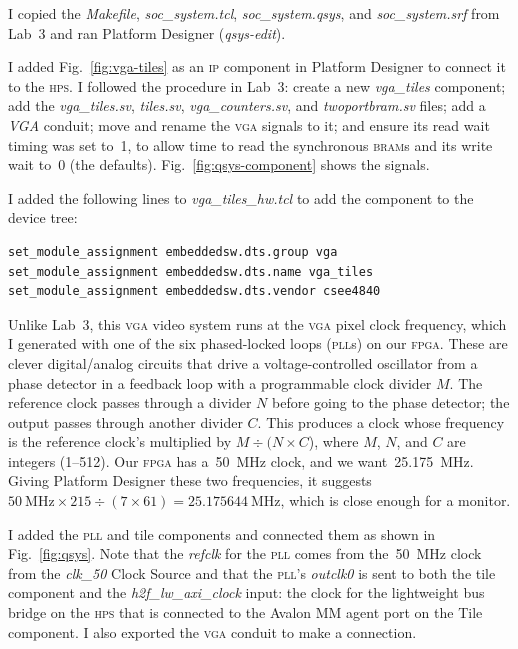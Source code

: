 \documentclass[11pt]{article}
\newcommand{\figref}[1]{Fig.~\ref{fig:#1}}
\begin{document}
I copied the \emph{Makefile}, \emph{soc\_system.tcl},
\emph{soc\_system.qsys}, and \emph{soc\_system.srf} from Lab~3 and ran
Platform Designer (\emph{qsys-edit}).

I added \figref{vga-tiles} as an \textsc{ip} component in Platform
Designer to connect it to the \textsc{hps}.  I followed the procedure
in Lab~3: create a new \emph{vga\_tiles} component; add the
\emph{vga\_tiles.sv}, \emph{tiles.sv}, \emph{vga\_counters.sv}, and
\emph{twoportbram.sv} files; add a \emph{VGA} conduit; move and rename
the \textsc{vga} signals to it; and ensure its read wait timing was
set to~1, to allow time to read the synchronous \textsc{bram}s and its
write wait to~0 (the defaults).  \figref{qsys-component} shows the
signals.

I added the following lines to \emph{vga\_tiles\_hw.tcl} to add the
component to the device tree:

\vspace{-0.5\baselineskip}

{\footnotesize
\begin{verbatim}
set_module_assignment embeddedsw.dts.group vga
set_module_assignment embeddedsw.dts.name vga_tiles
set_module_assignment embeddedsw.dts.vendor csee4840
\end{verbatim}
}

\vspace{-0.5\baselineskip}

Unlike Lab~3, this \textsc{vga} video system runs at the \textsc{vga}
pixel clock frequency, which I generated with one of the six
phased-locked loops (\textsc{pll}s) on our \textsc{fpga}.  These are
clever digital/analog circuits that drive a voltage-controlled
oscillator from a phase detector in a feedback loop with a
programmable clock divider $M$. The reference clock passes through a
divider $N$ before going to the phase detector; the output passes
through another divider $C$.  This produces a clock whose frequency is
the reference clock's multiplied by $M \div (N \times C$), where $M$,
$N$, and $C$ are integers (1--512).  Our \textsc{fpga} has a~50~MHz
clock, and we want~25.175~MHz.  Giving Platform Designer these two
frequencies, it suggests $50\ \text{MHz} \times 215 \div (7 \times 61)
= 25.175644\ \text{MHz}$, which is close enough for a monitor.

I added the \textsc{pll} and tile components and connected them as
shown in \figref{qsys}.  Note that the \emph{refclk} for the
\textsc{pll} comes from the~50~MHz clock from the \emph{clk\_50} Clock
Source and that the \textsc{pll}'s \emph{outclk0} is sent to both the
tile component and the \emph{h2f\_lw\_axi\_clock} input: the clock for
the lightweight bus bridge on the \textsc{hps} that is connected to
the Avalon MM agent port on the Tile component.  I also exported the
\textsc{vga} conduit to make a connection.
\end{document}
